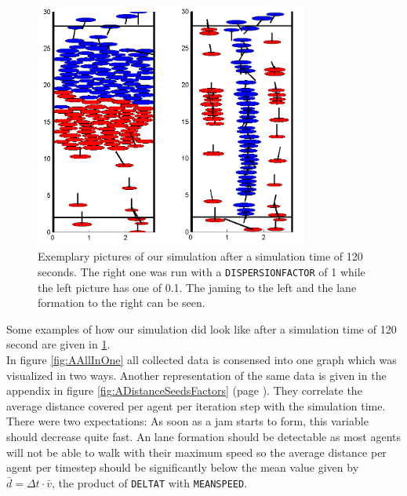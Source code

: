
\begin{figure}[h!]
	\centering
		\includegraphics[width=0.8\textwidth]{pictures/ex2picture.png}
	\caption{Exemplary pictures of our simulation after a simulation time of 120 seconds. The right one was run with a \texttt{DISPERSIONFACTOR} of 1 while the left picture has one of 0.1. The jaming to the left and the lane formation to the right can be seen.}
	\label{fig:ex2picture}
\end{figure}

\noi Some examples of how our simulation did look like after a simulation time of 120 second are given in \ref{fig:ex2picture}.\\

\noi In figure \ref{fig:AAllInOne} all collected data is consensed into one graph which was visualized in two ways. Another representation of the same data is given in the appendix in figure \ref{fig:ADistanceSeedsFactors} (page \pageref{fig:ADistanceSeedsFactors}). They correlate the average distance covered per agent per iteration step with the simulation time. There were two expectations: As soon as a jam starts to form, this variable should decrease quite fast. An lane formation should be detectable as most agents will not be able to walk with their maximum speed so the average distance per agent per timestep should be significantly below the mean value given by $\bar{d} = \Delta t \cdot \bar{v}$, the product of \texttt{DELTAT} with \texttt{MEANSPEED}.\\

